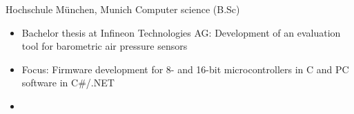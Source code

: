 \documentclass[%
               doublesided,
               paper=a4,
               fontsize=10pt
              ]{my-resume}
\begin{document}
{    
        {Hochschule München, Munich}
        {Computer science (B.Sc)}
        {\begin{itemize}
            \item Bachelor thesis at Infineon Technologies AG: Development of an evaluation tool for barometric air pressure sensors
            \item Focus: Firmware development for 8- and 16-bit microcontrollers in C and PC software in C\#/.NET
            \item[]   
        \end{itemize}}
    
    
}
\makebody
\clearpage
\end{document}
